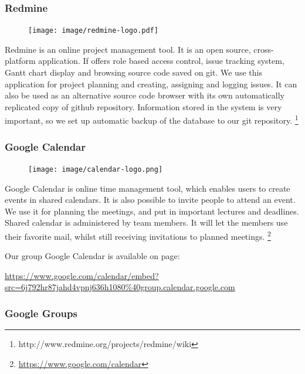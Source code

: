 \subsubsection{Redmine}

\begin{figure}
\vspace{-30pt}
\centering
\texttt{[image: image/redmine-logo.pdf]}
\end{figure}

Redmine is an online project management tool. It is an open source, cross-platform application. If offers role based access control, issue tracking system, Gantt chart display and browsing source code saved on git. We use this application for project planning and creating, assigning and logging issues. It can also be used as an alternative source code browser with its own automatically replicated copy of github repository. Information stored in the system is very important, so we set up automatic backup of the database to our git repository.
\footnote{http://www.redmine.org/projects/redmine/wiki}

\subsubsection{Google Calendar}

\begin{figure}
\vspace{-30pt}
\centering
\texttt{[image: image/calendar-logo.png]}
\end{figure}

Google Calendar is online time management tool, which enables users to create events in shared calendars. It is also possible to invite people to attend an event. We use it for planning the meetings, and put in important lectures and deadlines. Shared calendar is administered by team members. It will let the members use their favorite mail, whilst still receiving invitations to planned meetings.
\footnote{\url{https://www.google.com/calendar}}

Our group Google Calendar is available on page:

\url{https://www.google.com/calendar/embed?src=6j792hr87jahd4vpnj636h1080\%40group.calendar.google.com}

\subsubsection{Google Groups}

